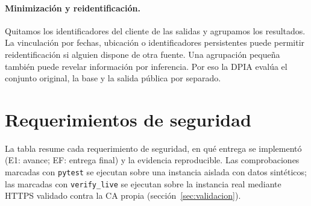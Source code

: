 \paragraph{Minimización y reidentificación.} Quitamos los identificadores del cliente de las salidas y agrupamos los resultados. La vinculación por fechas, ubicación o identificadores persistentes puede permitir reidentificación si alguien dispone de otra fuente. Una agrupación pequeña también puede revelar información por inferencia. Por eso la DPIA evalúa el conjunto original, la base y la salida pública por separado.

\section{Requerimientos de seguridad}
\label{sec:requisitos-seguridad}
La tabla resume cada requerimiento de seguridad, en qué entrega se implementó (E1: avance; EF: entrega final) y la evidencia reproducible. Las comprobaciones marcadas con \texttt{pytest} se ejecutan sobre una instancia aislada con datos sintéticos; las marcadas con \texttt{verify\_live} se ejecutan sobre la instancia real mediante HTTPS validado contra la CA propia (sección~\ref{sec:validacion}).

